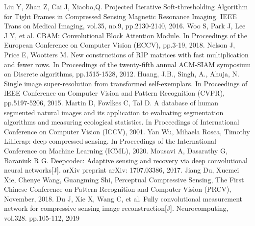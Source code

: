 \documentclass[conference]{IEEEtran}
\begin{document}
\begin{thebibliography}{1}
Liu Y, Zhan Z, Cai J, Xiaobo,Q. Projected Iterative Soft-thresholding Algorithm for Tight Frames in Compressed Sensing Magnetic Resonance Imaging. IEEE Trans on Medical Imaging, vol.35, no.9, pp.2130-2140, 2016.
Woo S, Park J, Lee J Y, et al. CBAM: Convolutional Block Attention Module. In Proceedings of the European Conference on Computer Vision (ECCV), pp.3-19, 2018.
Nelson J, Price E, Wootters M. New constructions of RIP matrices with fast multiplication and fewer rows. In Proceedings of the twenty-fifth annual ACM-SIAM symposium on Discrete algorithms, pp.1515-1528, 2012.
Huang, J.B., Singh, A., Ahuja, N. Single image super-resolution from transformed self-exemplars. In Proceedings of IEEE Conference on Computer Vision and Pattern Recognition (CVPR), pp.5197-5206, 2015.
Martin D, Fowlkes C, Tal D. A database of human segmented natural images and its application to evaluating segmentation algorithms and measuring ecological statistics. In Proceedings of International Conference on Computer Vision (ICCV), 2001.
Yan Wu, Mihaela Rosca, Timothy Lillicrap: deep compressed sensing. In Proceedings of the International Conference on Machine Learning (ICML), 2020.
Mousavi A, Dasarathy G, Baraniuk R G. Deepcodec: Adaptive sensing and recovery via deep convolutional neural networks[J]. arXiv preprint arXiv: 1707.03386, 2017.
Jiang Du, Xuemei Xie, Chenye Wang, Guangming Shi, Perceptual Compressive Sensing, The First Chinese Conference on Pattern Recognition and Computer Vision (PRCV), November, 2018.
Du J, Xie X, Wang C, et al. Fully convolutional measurement network for compressive sensing image reconstruction[J]. Neurocomputing, vol.328. pp.105-112, 2019
\end{thebibliography}
\end{document}
